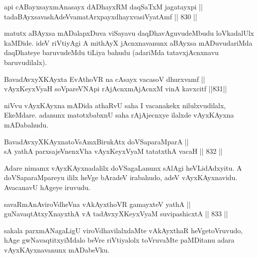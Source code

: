 \begin{shl}
api cABayxsayxmAnasayx dADhayxRM daqSaTxM jagatayxpi || \\
tadaBAyxsavashAdeVvamatArxpayxdhayxvasiVyatAmf \hfill || 830 ||  
\end{shl}

\begin{artha}
matutx aBAyxsa mADalapxDuva viSayavu daqDhavAguvudeMbudu loVkadalUlx kaMDide. ideV riVtiyAgi A mithAyX jAcnxnavanunx aBAyxsa mADuvudariMda daqDhateye baruvudeMdu tiLiya bahudu (adariMda tatavxjAcnxnavu baruvudilalx).
\end{artha}

\begin{shl}
BavadAvxyXKAyxta EvAthoVR na cAsayx vacasoV dhurxvamf || \\
vAyxKeyxVyaH soV\s pareVNApi rAjAcnxmAjAcnxM vinA kavxcitf \hfill ||831||  
\end{shl}
				
\begin{artha}
niVvu vAyxKAyxna mADida athaRvU saha I vacanakekx nilulxvudilalx, EkeMdare. adanunx matotxbabxnU  saha rAjAjecnxye ilalxde vAyxKAyxna mADabahudu.
\end{artha}

\begin{shl}
BavadAvxyXKAyxnatoV\s sAmxBirukAtx doVSaparaMparA || \\
sA yathA parxsajeVnenxVha vAyxKeyxVyaM tatatxthA vacaH \hfill || 832 ||  
\end{shl}

\begin{artha}
Adare nimamx vAyxKAyxnadalilx doVSagaLanunx sAlAgi heVLidAdxyitu. A doVSaparaMpareyu ililx heVge bAradeV irabahudo, adeV vAyxKAyxnavidu.  AvacanavU hAgeye iruvudu.
\end{artha}


\begin{shl}
savaRmAnAviroVdheVna vAkAyxthoVR gamayxteV yathA || \\
guNavaqtAtxyX\s nayxthA vA tadAvxyXKeyxVyaM suvipashicxtA \hfill || 833 ||  
\end{shl}

\begin{artha}
sakala parxmANagaLigU viroVdhavilalxdaMte vAkAyxthaR heVge\break toVruvudo, hAge gwNavaqtitxyiMdalo beVre riVtiyalolx toVruvaMte paMDitanu adara vAyxKAyxnavanunx mADabeVku.
\end{artha}

